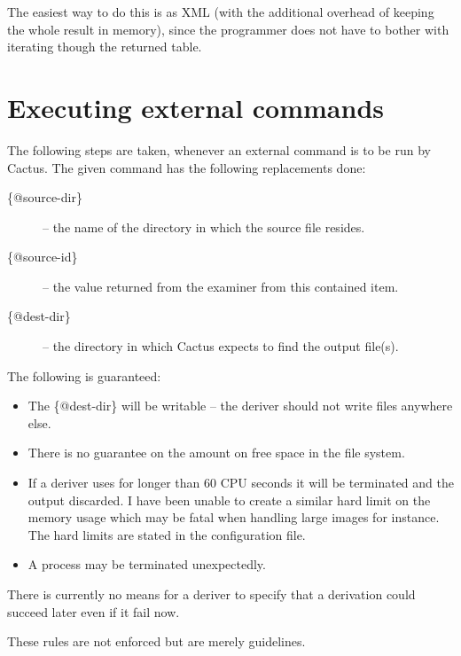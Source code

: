 The easiest way to do this is as XML (with the additional
overhead of keeping the whole result in memory), since the
programmer does not have to bother with iterating though the
returned table. 

\section{Executing external commands}

The following steps are taken, whenever an external command is to be
run by Cactus.  The given command has the following replacements done:


\begin{description}
  
\item[\{@source-dir\}] -- the name of the directory in which the
source file resides.


\item[\{@source-id\}] -- the value returned from the examiner from
  this contained item.
  
\item[\{@dest-dir\}] -- the directory in which Cactus expects to find
  the output file(s).
\end{description}

The following is guaranteed:

\begin{itemize}

\item The \{@dest-dir\} will be writable -- the deriver should not
write files anywhere else.

\item There is no guarantee on the amount on free space in the file
system.

\item If a deriver uses for longer than 60 CPU seconds it will be
terminated and the output discarded.  I have been unable to create a
similar hard limit on the memory usage which may be fatal when
handling large images for instance.  The hard limits are stated in the
configuration file.

\item A process may be terminated unexpectedly.
\end{itemize}

There is currently no means for a deriver to specify that a derivation could succeed later even if it fail now.

These rules are not enforced but are merely guidelines.

